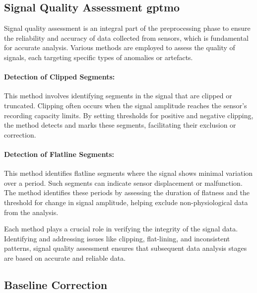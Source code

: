 \subsection*{Signal Quality Assessment \gls*{gptmo}}
\label{sec:signal_quality_assessment }

Signal quality assessment is an integral part of the preprocessing phase to ensure the reliability and accuracy of data collected from sensors, which is fundamental for accurate analysis. Various methods are employed to assess the quality of signals, each targeting specific types of anomalies or artefacts.

\paragraph{Detection of Clipped Segments:}
This method involves identifying segments in the signal that are clipped or truncated. Clipping often occurs when the signal amplitude reaches the sensor's recording capacity limits. By setting thresholds for positive and negative clipping, the method detects and marks these segments, facilitating their exclusion or correction.

\paragraph{Detection of Flatline Segments:}
This method identifies flatline segments where the signal shows minimal variation over a period. Such segments can indicate sensor displacement or malfunction. The method identifies these periods by assessing the duration of flatness and the threshold for change in signal amplitude, helping exclude non-physiological data from the analysis.


Each method plays a crucial role in verifying the integrity of the signal data. Identifying and addressing issues like clipping, flat-lining, and inconsistent patterns, signal quality assessment ensures that subsequent data analysis stages are based on accurate and reliable data.



\subsection*{Baseline Correction}
\label{sec:baseline_correction}

